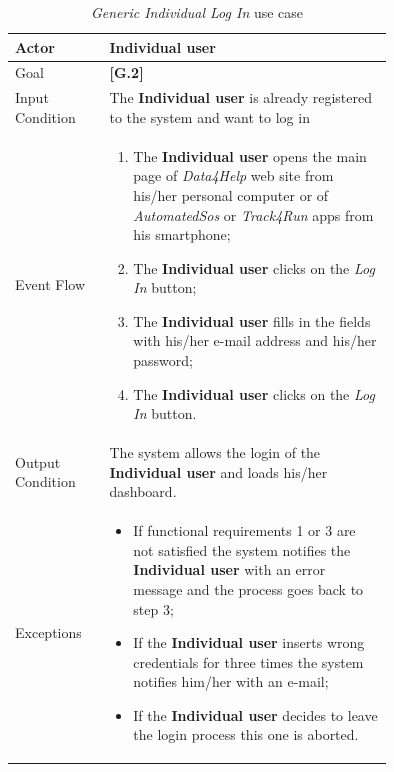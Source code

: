 \begin{center}
\begin{table}
\begin{tabular}{ | l | p{0.75\linewidth} | }
  \hline
    Actor & \textbf{Individual user} \\ \hline
    Goal & \textbf{[G.2]} \\ \hline
    Input Condition & The \textbf{Individual user} is already registered to the system and want to log in \\ \hline
    Event Flow & \begin{minipage}[t]{0.7\textwidth}
      \begin{enumerate}
        \item The \textbf{Individual user} opens the main page of \textit{Data4Help} web site from his/her personal computer or of \textit{AutomatedSos} or \textit{Track4Run} apps from his smartphone;
        \item The \textbf{Individual user} clicks on the \textit{Log In} button;
        \item The \textbf{Individual user} fills in the fields with his/her e-mail address and his/her password;
        \item The \textbf{Individual user} clicks on the \textit{Log In} button.
      \end{enumerate}
    \smallskip
  \end{minipage} \\ \hline
  Output Condition & The system allows the login of the \textbf{Individual user} and loads his/her dashboard. \\ \hline
  Exceptions & \begin{minipage}[t]{0.7\textwidth}
    \begin{itemize}
      \smallskip
      \item If functional requirements 1 or 3 are not satisfied the system notifies the \textbf{Individual user} with an error message and the process goes back to step 3;
      \item If the \textbf{Individual user} inserts wrong credentials for three times the system notifies him/her with an e-mail;
      \item If the \textbf{Individual user} decides to leave the login process this one is aborted.
    \end{itemize}
    \smallskip
  \end{minipage}  \\ \hline
\end{tabular}
\caption{\textit{Generic Individual Log In} use case}
\label{table:genericIndividualLogInInTable}
\end{table}
\end{center}

